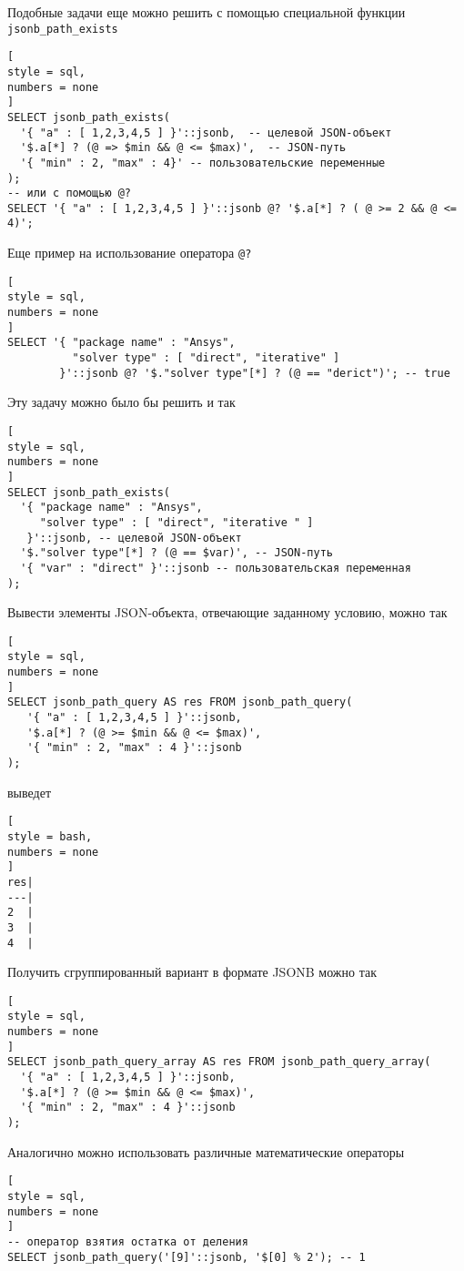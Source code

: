 \documentclass[%
	11pt,
	a4paper,
	utf8,
		]{article}
\begin{document}
Подобные задачи еще можно решить с помощью специальной функции \verb|jsonb_path_exists|
\begin{lstlisting}[
style = sql, 
numbers = none
]
SELECT jsonb_path_exists(
  '{ "a" : [ 1,2,3,4,5 ] }'::jsonb,  -- целевой JSON-объект
  '$.a[*] ? (@ => $min && @ <= $max)',  -- JSON-путь 
  '{ "min" : 2, "max" : 4}' -- пользовательские переменные
);
-- или с помощью @?
SELECT '{ "a" : [ 1,2,3,4,5 ] }'::jsonb @? '$.a[*] ? ( @ >= 2 && @ <= 4)';
\end{lstlisting}

Еще пример на использование оператора \verb|@?|
\begin{lstlisting}[
style = sql, 
numbers = none
]
SELECT '{ "package name" : "Ansys",
          "solver type" : [ "direct", "iterative" ]
        }'::jsonb @? '$."solver type"[*] ? (@ == "derict")'; -- true
\end{lstlisting}

Эту задачу можно было бы решить и так
\begin{lstlisting}[
style = sql, 
numbers = none
]
SELECT jsonb_path_exists(
  '{ "package name" : "Ansys",
     "solver type" : [ "direct", "iterative " ]
   }'::jsonb, -- целевой JSON-объект
  '$."solver type"[*] ? (@ == $var)', -- JSON-путь
  '{ "var" : "direct" }'::jsonb -- пользовательская переменная
);
\end{lstlisting}

Вывести элементы JSON-объекта, отвечающие заданному условию, можно так
\begin{lstlisting}[
style = sql, 
numbers = none
]
SELECT jsonb_path_query AS res FROM jsonb_path_query(
   '{ "a" : [ 1,2,3,4,5 ] }'::jsonb,
   '$.a[*] ? (@ >= $min && @ <= $max)',
   '{ "min" : 2, "max" : 4 }'::jsonb
);
\end{lstlisting}
выведет
\begin{lstlisting}[
style = bash, 
numbers = none
]
res|
---|
2  |
3  |
4  |
\end{lstlisting}

Получить сгруппированный вариант в формате JSONB можно так
\begin{lstlisting}[
style = sql, 
numbers = none
]
SELECT jsonb_path_query_array AS res FROM jsonb_path_query_array(
  '{ "a" : [ 1,2,3,4,5 ] }'::jsonb,
  '$.a[*] ? (@ >= $min && @ <= $max)',
  '{ "min" : 2, "max" : 4 }'::jsonb
);
\end{lstlisting}

Аналогично можно использовать различные математические операторы
\begin{lstlisting}[
style = sql, 
numbers = none
]
-- оператор взятия остатка от деления
SELECT jsonb_path_query('[9]'::jsonb, '$[0] % 2'); -- 1
\end{lstlisting}
\end{document}
